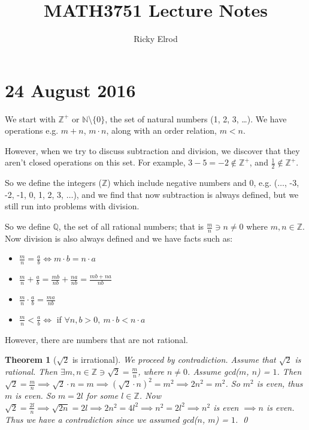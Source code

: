 \documentclass{article}
\title{MATH3751 Lecture Notes}
\author{Ricky Elrod}
\theoremstyle{break}
\newtheorem{theorem}{Theorem}
\begin{document}
\maketitle

\section{24 August 2016}

We start with $\mathbb{Z}^+$ or $\mathbb{N}$\textbackslash$\{0\}$, the set of
natural numbers (1, 2, 3, \ldots). We have operations e.g. $m + n$, $m \cdot
n$, along with an order relation, $m < n$.

However, when we try to discuss subtraction and division, we discover that they
aren't closed operations on this set. For example, $3 - 5 = -2 \not\in
\mathbb{Z}^+$, and $\frac{1}{2} \not\in \mathbb{Z}^+$.

So we define the integers ($\mathbb{Z}$) which include negative numbers and $0$,
e.g. ($\ldots$, -3, -2, -1, 0, 1, 2, 3, $\ldots$), and we find that now
subtraction is always defined, but we still run into problems with division.

So we define $\mathbb{Q}$, the set of all rational numbers; that is $\frac{m}{n}
\ni n \not= 0$ where $m, n \in \mathbb{Z}$. Now division is also always defined
and we have facts such as:
\begin{itemize}
\item $\frac{m}{n} = \frac{a}{b} \iff m \cdot b = n \cdot a$
\item $\frac{m}{n} + \frac{a}{b} = \frac{mb}{nb} + \frac{na}{nb} = \frac{mb +
    na}{nb}$
\item $\frac{m}{n} \cdot \frac{a}{b} = \frac{ma}{nb}$
\item $\frac{m}{n} < \frac{a}{b} \iff$ if $\forall n, b > 0,\ m \cdot b < n \cdot a$
\end{itemize}

However, there are numbers that are not rational.

\begin{theorem}[$\sqrt{2}$ is irrational]
  We proceed by contradiction. Assume that $\sqrt{2}$ is rational. Then $\exists
  m, n \in \mathbb{Z} \ni \sqrt{2} = \frac{m}{n}$, where $n \not= 0$. Assume
  gcd($m$, $n$) = $1$. Then $\sqrt{2} = \frac{m}{n} \implies \sqrt{2} \cdot n =
  m \implies (\sqrt{2} \cdot n)^2 = m^2 \implies 2n^2 = m^2$. So $m^2$ is even,
  thus $m$ is even. So $m = 2l$ for some $l \in \mathbb{Z}$. Now $\sqrt{2} =
  \frac{2l}{n} \implies \sqrt{2n} = 2l \implies 2n^2 = 4l^2 \implies n^2 = 2l^2
  \implies n^2$ is even $\implies n$ is even. Thus we have a contradiction since
  we assumed gcd($n$, $m$) = $1$. \qed
\end{theorem}
\end{document}
